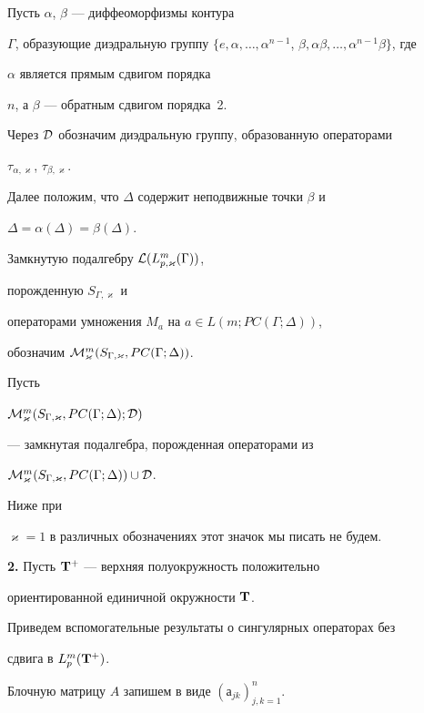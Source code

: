 Пусть $\alpha$, $\beta$ --- диффеоморфизмы контура


$\Gamma$, образующие диэдральную группу $\{e, \alpha,


\dotsc,\alpha^{n-1}$, $\beta,\alpha\beta,




\dotsc,\alpha^{n-1}\beta\}$, где


$\alpha$ является прямым сдвигом порядка


$n$, а $\beta$ --- обратным сдвигом порядка~2.


Через ${\cal D}$ обозначим диэдральную группу, образованную операторами


$\tau_{\alpha,\varkappa}$, $\tau_{\beta,\varkappa}$.


Далее положим, что $\Delta$ содержит неподвижные точки $\beta$ и


$\Delta=\alpha(\Delta)=\beta (\Delta)$.





Замкнутую подалгебру ${\cal L}(L_{p,\varkappa}^m(\Gamma))$,


порожденную $S_{\Gamma, \varkappa}$ и


операторами умножения $M_a$ на $a\in L(m;PC(\Gamma;\Delta))$,


обозначим ${\cal M}^m_{\varkappa} (S_{\Gamma,\varkappa},PC(\Gamma;\Delta))$.


Пусть


${\cal M}^m_{\varkappa} (S_{\Gamma, \varkappa},PC(\Gamma;\Delta);{\cal D})$


--- замкнутая подалгебра, порожденная операторами из


${\cal M}^m_{\varkappa}(S_{\Gamma,\varkappa},PC(\Gamma;\Delta))\cup{\cal D}$.


Ниже при


$\varkappa =1$ в различных обозначениях этот значок мы писать не будем.


\medskip





{\bf 2.} Пусть ${\bold T}^+$ --- верхняя полуокружность положительно


ориентированной единичной окружности ${\bold T}$.


Приведем вспомогательные результаты о сингулярных операторах без


сдвига в $L^m_p({\bold T}^+)$.


Блочную матрицу $A$ запишем в виде $(а_{jk})_{j,k=1}^n$.


